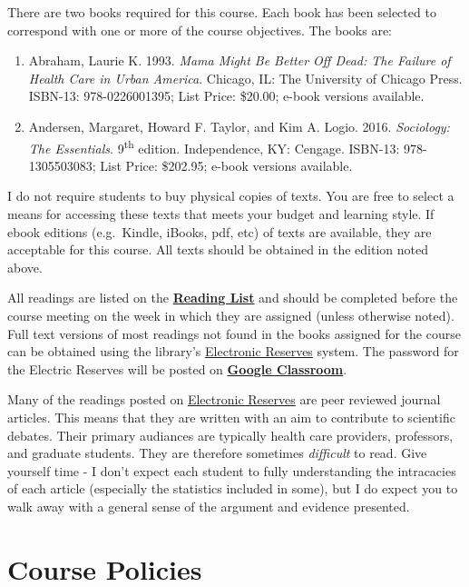 \documentclass[]{book}
\theoremstyle{definition}
\theoremstyle{definition}
\theoremstyle{definition}
\theoremstyle{remark}
\begin{document}
There are two books required for this course. Each book has been
selected to correspond with one or more of the course objectives. The
books are:

\begin{enumerate}
\def\labelenumi{\arabic{enumi}.}
\item
  Abraham, Laurie K. 1993. \emph{Mama Might Be Better Off Dead: The
  Failure of Health Care in Urban America}. Chicago, IL: The University
  of Chicago Press. ISBN-13: 978-0226001395; List Price: \$20.00; e-book
  versions available.
\item
  Andersen, Margaret, Howard F. Taylor, and Kim A. Logio. 2016.
  \emph{Sociology: The Essentials}. 9\textsuperscript{th} edition.
  Independence, KY: Cengage. ISBN-13: 978-1305503083; List Price:
  \$202.95; e-book versions available.
\end{enumerate}

I do not require students to buy physical copies of texts. You are free
to select a means for accessing these texts that meets your budget and
learning style. If ebook editions (e.g.~Kindle, iBooks, pdf, etc) of
texts are available, they are acceptable for this course. All texts
should be obtained in the edition noted above.

All readings are listed on the
\href{/lecture-schedule.html}{\textbf{Reading List}} and should be
completed before the course meeting on the week in which they are
assigned (unless otherwise noted). Full text versions of most readings
not found in the books assigned for the course can be obtained using the
library's
\href{http://eres.slu.edu/eres/coursepass.aspx?cid=4443}{Electronic
Reserves} system. The password for the Electric Reserves will be posted
on \textbf{\href{https://classroom.google.com}{Google Classroom}}.

Many of the readings posted on
\href{http://eres.slu.edu/eres/coursepass.aspx?cid=4443}{Electronic
Reserves} are peer reviewed journal articles. This means that they are
written with an aim to contribute to scientific debates. Their primary
audiances are typically health care providers, professors, and graduate
students. They are therefore sometimes \emph{difficult} to read. Give
yourself time - I don't expect each student to fully understanding the
intracacies of each article (especially the statistics included in
some), but I do expect you to walk away with a general sense of the
argument and evidence presented.

\hypertarget{course-policies}{%
\chapter{Course Policies}\label{course-policies}}
\end{document}
